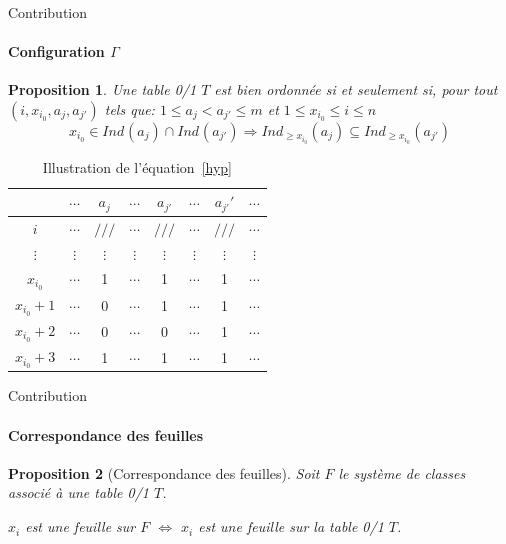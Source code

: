 \documentclass{beamer}
\newtheorem{proposition}{Proposition}
\begin{document}
  \begin{frame}{Contribution}
  \framesubtitle{Configuration $\Gamma$}
  \begin{proposition}
  Une table 0/1 $T$ est bien ordonnée
  si et seulement si, 
  pour tout $(i, x_{i_0}, a_j, a_{j'})$ tels que: $1 \leq a_j < a_{j'} \leq m$ et $1 \leq x_{i_0} \leq i \leq n$
  \begin{equation}
  x_{i_0} \in Ind_{}(a_j) \cap Ind_{}(a_{j'}) 
  \Rightarrow
  Ind_{\geqslant x_{i_0}}(a_j) \subseteq Ind_{\geqslant x_{i_0}}(a_{j'})
  \label{hyp} 
  \end{equation}
  \end{proposition}

  \begin{table}
  \centering
  \begin{tabular}{*{7}{c|} c}
	  & $\cdots$ & $a_j$ & $\cdots$ & $a_{j'}$  & $\cdots$ & $a_{j'}'$ & $\cdots$\\
  \hline
	$i$ & $\cdots$ & $///$ & $\cdots$ & $///$  & $\cdots$ & $///$  & $\cdots$\\
  \hline
	$\vdots$ & $\vdots$ & $\vdots$ & $\vdots$ & $\vdots$  & $\vdots$ & $\vdots$ & $\vdots$\\
  \hline
	$x_{i_0}$ & $\cdots$ & 1 & $\cdots$ & 1 & $\cdots$ & 1 & $\cdots$\\
  \hline
	$x_{i_0} + 1$ & $\cdots$ & 0 & $\cdots$ & 1 & $\cdots$ & 1 & $\cdots$\\
  \hline
	$x_{i_0} + 2$ & $\cdots$ & 0 & $\cdots$ & 0 & $\cdots$ & 1 & $\cdots$\\
  \hline
	$x_{i_0} + 3$ & $\cdots$ & 1 & $\cdots$ & 1 & $\cdots$ & 1 & $\cdots$\\
  \end{tabular}
  \caption{Illustration de l'équation~\ref{hyp}}
  \end{table}
  \end{frame}

  \begin{frame}{Contribution}
  \framesubtitle{Correspondance des feuilles}
  \begin{proposition}[Correspondance des feuilles]
  \label{propfeuille}
  Soit $F$ le système de classes associé à une table 0/1 $T$.

  $x_i$ est une feuille sur $F$ 
  $\Leftrightarrow$
  $x_i$ est une feuille sur la table 0/1 $T$.
  \end{proposition}
  \end{frame}
\end{document}
